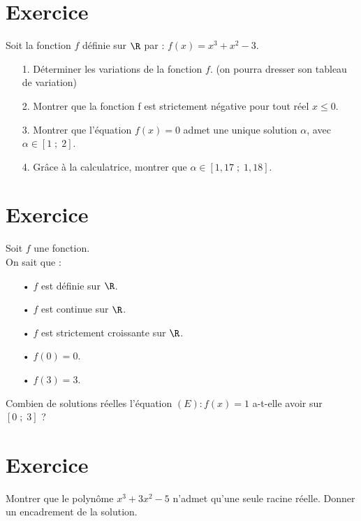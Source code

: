 \section*{Exercice }

Soit la fonction $f$ définie sur $\R$ par : $f(x) = x^3 + x^2 - 3$. \\

\begin{itemize}
\item[1.] Déterminer les variations de la fonction $f$. (on pourra dresser son tableau de variation) \\
\item[2.] Montrer que la fonction f est strictement négative pour tout réel $x\leqslant 0$. \\ 
\item[3.] Montrer que l'équation $f(x) = 0$ admet une unique solution $\alpha$, avec $\alpha \in \left[1 \; ; \; 2\right]$. \\
\item[4.] Grâce à la calculatrice, montrer que $\alpha \in \left[1,17 \; ; \; 1,18\right]$. 
\end{itemize}

\section*{Exercice } 

Soit $f$ une fonction. \\

On sait que : \\

\begin{itemize}
\item[•] $f$ est définie sur $\R$.
\item[•] $f$ est continue sur $\R$.
\item[•] $f$ est strictement croissante sur $\R$.
\item[•] $f(0) = 0$.
\item[•] $f(3) = 3$.
\end{itemize}

Combien de solutions réelles l'équation $\left(E\right) : f(x) = 1$ a-t-elle avoir sur $\left[0 \; ; \; 3\right]$ ?

\section*{Exercice }

Montrer que le polynôme $x^3 + 3x^2 - 5$ n'admet qu'une seule racine réelle. Donner un encadrement de la solution. 

